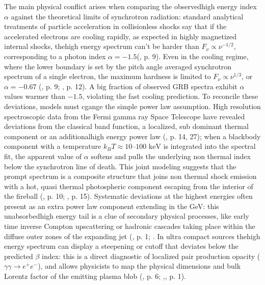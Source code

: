 \documentclass{aa} %
\begin{document}
The main physical conflict arises when comparing the observedhigh energy index $\alpha$ against the theoretical limits of synchrotron radiation: standard analytical treatments of particle acceleration in collisionless shocks say that if the accelerated electrons are cooling rapidly, as expected in highly magnetized internal shocks, thehigh energy spectrum can't be harder than $F_\nu \propto \nu^{-1/2}$, corresponding to a photon index $\alpha = -1.5$(\citet{Peer2019}, p. 9). Even in the cooling regime, where the lower boundary is set by the pitch angle averaged synchrotron spectrum of a single electron, the maximum hardness is limited to $F_\nu \propto \nu^{1/3}$, or $\alpha = -0.67$ (\citet{Peer2019}, p. 9; \citet{KumarandZhang2015}, p. 12). A big fraction of observed GRB spectra exhibit $\alpha$ values warmer than $-1.5$, violating the fast cooling prediction.
To reconcile these deviations, models must cgange the simple power law assumption. High resolution spectroscopic data from the Fermi gamma ray Space Telescope have revealed deviations from the classical band function, a localized, sub dominant thermal component or an additionalhigh energy power law (\citet{KumarandZhang2015}, p. 14, 27); when a blackbody component with a temperature $k_B T \approx 10\text{–}100\text{ keV}$ is integrated into the spectral fit, the apparent value of $\alpha$ softens and pulls the underlying non thermal index below the synchrotron line of death. This joint modeling suggests that the prompt spectrum is a composite structure that joins non thermal shock emission with a hot, quasi thermal photospheric component escaping from the interior of the fireball (\citet{Peer2019}, p. 10; \citet{KumarandZhang2015}, p. 15).
Systematic deviations at the highest energies often present as an extra power law component extending in the GeV: this unabsorbedhigh energy tail is a clue of secondary physical processes, like early time inverse Compton upscattering or hadronic cascades taking place within the diffuse outer zones of the expanding jet (\citet{Boettcheretal1996}, p. 1; \citep{Brainerd1999}. In ultra compact sources thehigh energy spectrum can display a steepening or cutoff that deviates below the predicted $\beta$ index: this is a direct diagnostic of localized pair production opacity ($\gamma\gamma \rightarrow e^+e^-$), and allows physicists to map the physical dimensions and bulk Lorentz factor of the emitting plasma blob (\citet{KumarandZhang2015}, p. 6; \citet{Boettcheretal1996},\citet{Haileyetal1999}, p. 1).
\end{document}
